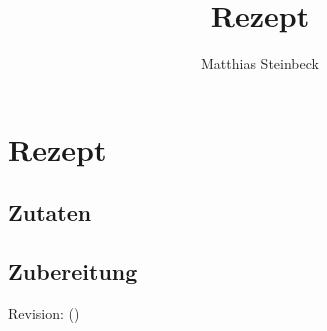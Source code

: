 \documentclass[10pt,a4paper]{article}
\author{Matthias Steinbeck}
\title{Rezept}
\begin{document}
\section*{Rezept}
\subsection*{Zutaten}
\subsection*{Zubereitung}
Revision\gitVtags: \gitAbbrevHash{} (\gitAuthorDate)
\end{document}

